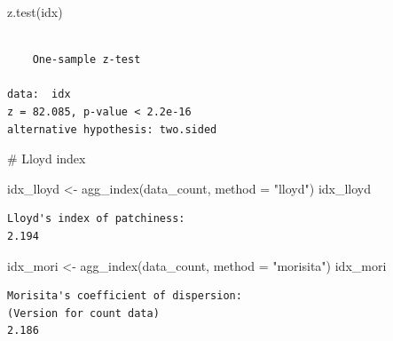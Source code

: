 \documentclass[
  letterpaper,
  DIV=11,
  numbers=noendperiod]{scrreprt}
\newenvironment{Shaded}{\begin{snugshade}}{\end{snugshade}}
\newcommand{\AttributeTok}[1]{\textcolor[rgb]{0.40,0.45,0.13}{#1}}
\newcommand{\CommentTok}[1]{\textcolor[rgb]{0.37,0.37,0.37}{#1}}
\newcommand{\FunctionTok}[1]{\textcolor[rgb]{0.28,0.35,0.67}{#1}}
\newcommand{\NormalTok}[1]{\textcolor[rgb]{0.00,0.23,0.31}{#1}}
\newcommand{\OtherTok}[1]{\textcolor[rgb]{0.00,0.23,0.31}{#1}}
\newcommand{\SpecialCharTok}[1]{\textcolor[rgb]{0.37,0.37,0.37}{#1}}
\newcommand{\StringTok}[1]{\textcolor[rgb]{0.13,0.47,0.30}{#1}}
\begin{document}
\begin{Shaded}
\begin{Highlighting}[]
\FunctionTok{z.test}\NormalTok{(idx)}
\end{Highlighting}
\end{Shaded}

\begin{verbatim}

    One-sample z-test

data:  idx
z = 82.085, p-value < 2.2e-16
alternative hypothesis: two.sided
\end{verbatim}

\begin{Shaded}
\begin{Highlighting}[]
\CommentTok{\# Lloyd index}

\NormalTok{idx\_lloyd }\OtherTok{\textless{}{-}} \FunctionTok{agg\_index}\NormalTok{(data\_count, }\AttributeTok{method =} \StringTok{"lloyd"}\NormalTok{)}
\NormalTok{idx\_lloyd}
\end{Highlighting}
\end{Shaded}

\begin{verbatim}
Lloyd's index of patchiness:
2.194
\end{verbatim}

\begin{Shaded}
\begin{Highlighting}[]
\NormalTok{idx\_mori }\OtherTok{\textless{}{-}} \FunctionTok{agg\_index}\NormalTok{(data\_count, }\AttributeTok{method =} \StringTok{"morisita"}\NormalTok{)}
\NormalTok{idx\_mori}
\end{Highlighting}
\end{Shaded}

\begin{verbatim}
Morisita's coefficient of dispersion:
(Version for count data)
2.186
\end{verbatim}

\begin{Shaded}
\end{Shaded}
\end{document}
